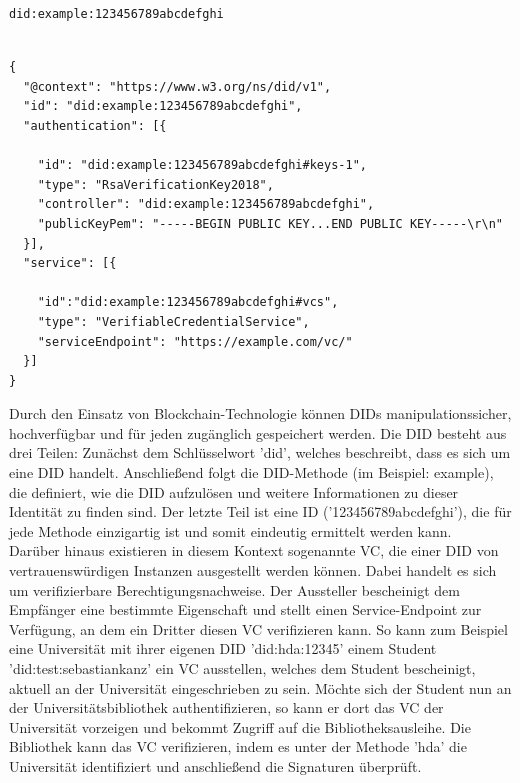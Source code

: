 \begin{lstlisting}[caption=Beispiel einer DID,label=listing:did]
did:example:123456789abcdefghi
\end{lstlisting}

\begin{lstlisting}[caption=Beispiel eines DID-Dokuments,label=listing:did_document]

{
  "@context": "https://www.w3.org/ns/did/v1",
  "id": "did:example:123456789abcdefghi",
  "authentication": [{

    "id": "did:example:123456789abcdefghi#keys-1",
    "type": "RsaVerificationKey2018",
    "controller": "did:example:123456789abcdefghi",
    "publicKeyPem": "-----BEGIN PUBLIC KEY...END PUBLIC KEY-----\r\n"
  }],
  "service": [{

    "id":"did:example:123456789abcdefghi#vcs",
    "type": "VerifiableCredentialService",
    "serviceEndpoint": "https://example.com/vc/"
  }]
}
\end{lstlisting}

Durch den Einsatz von Blockchain-Technologie können \ac{DID}s manipulationssicher, hochverfügbar und für jeden zugänglich gespeichert werden. Die \ac{DID} besteht aus drei Teilen: Zunächst dem Schlüsselwort 'did', welches beschreibt, dass es sich um eine \ac{DID} handelt. Anschließend folgt die DID-Methode (im Beispiel: example), die definiert, wie die \ac{DID} aufzulösen und weitere Informationen zu dieser Identität zu finden sind. Der letzte Teil ist eine ID ('123456789abcdefghi'), die für jede Methode einzigartig ist und somit eindeutig ermittelt werden kann.\\
Darüber hinaus existieren in diesem Kontext sogenannte \ac{VC}, die einer \ac{DID} von vertrauenswürdigen Instanzen ausgestellt werden können. Dabei handelt es sich um verifizierbare Berechtigungsnachweise. Der Aussteller bescheinigt dem Empfänger eine bestimmte Eigenschaft und stellt einen Service-Endpoint zur Verfügung, an dem ein Dritter diesen \ac{VC} verifizieren kann. So kann zum Beispiel eine Universität mit ihrer eigenen \ac{DID} 'did:hda:12345' einem Student 'did:test:sebastiankanz' ein \ac{VC} ausstellen, welches dem Student bescheinigt, aktuell an der Universität eingeschrieben zu sein. Möchte sich der Student nun an der Universitätsbibliothek authentifizieren, so kann er dort das \ac{VC} der Universität vorzeigen und bekommt Zugriff auf die Bibliotheksausleihe. Die Bibliothek kann das \ac{VC} verifizieren, indem es unter der Methode 'hda' die Universität identifiziert und anschließend die Signaturen überprüft.


